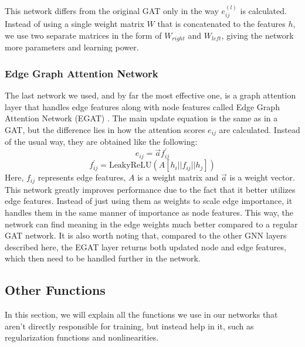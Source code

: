 \documentclass[times, utf8, diplomski, english]{fer_eng}
\begin{document}
This network differs from the original GAT only in the way $e_{ij}^{(l)}$ is calculated. Instead of using a single weight matrix $W$ that is concatenated to the features $h$, we use two separate matrices in the form of $W_{right}$ and $W_{left}$, giving the network more parameters and learning power.

\subsubsection{Edge Graph Attention Network}
\label{subsubsec:edge graph attention network}

The last network we used, and by far the most effective one, is a graph attention layer that handles edge features along with node features called Edge Graph Attention Network (EGAT) \cite{EGAT}. The main update equation is the same as in a GAT, but the difference lies in how the attention scores $e_{ij}$ are calculated. Instead of the usual way, they are obtained like the following:
\[ e_{ij} = \vec{a} f_{ij}^{'} \]
\[ f_{ij}^{'} = \mathrm{LeakyReLU} (A[h_i||f_{ij}||h_j]) \]
Here, $f_{ij}$ represents edge features, $A$ is a weight matrix and $\vec{a}$ is a weight vector. This network greatly improves performance due to the fact that it better utilizes edge features. Instead of just using them as weights to scale edge importance, it handles them in the same manner of importance as node features. This way, the network can find meaning in the edge weights much better compared to a regular GAT network. It is also worth noting that, compared to the other GNN layers described here, the EGAT layer returns both updated node and edge features, which then need to be handled further in the network.

\subsection{Other Functions}
\label{subsec:other functions}

In this section, we will explain all the functions we use in our networks that aren't directly responsible for training, but instead help in it, such as regularization functions and nonlinearities.
\end{document}
